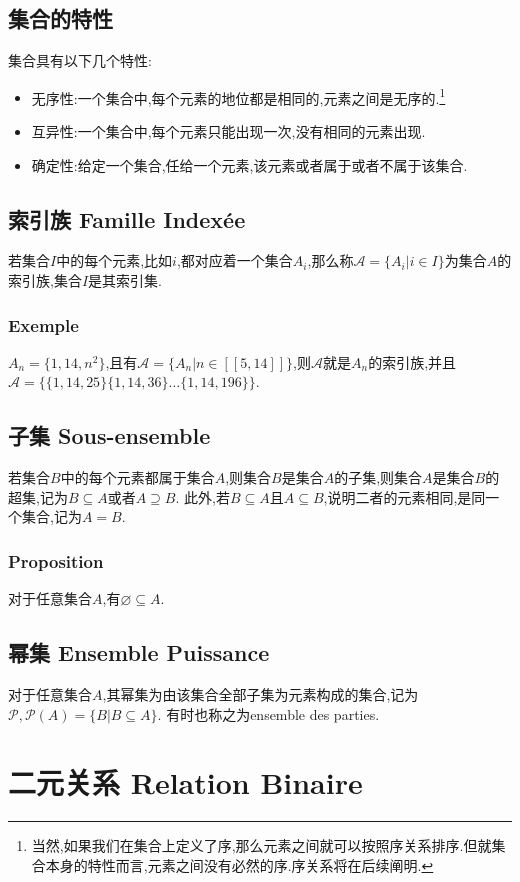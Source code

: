 \documentclass[12pt, a4paper, oneside]{ctexbook}
\begin{document}
  \subsection{集合的特性}
  集合具有以下几个特性:
  \begin{itemize}
    \item 无序性:一个集合中,每个元素的地位都是相同的,元素之间是无序的.\footnote{
      当然,如果我们在集合上定义了序,那么元素之间就可以按照序关系排序.但就集合本身的特性而言,元素之间没有必然的序.序关系将在后续阐明.
    }
    \item 互异性:一个集合中,每个元素只能出现一次,没有相同的元素出现.
    \item 确定性:给定一个集合,任给一个元素,该元素或者属于或者不属于该集合.\label{myref:quedingxing}
  \end{itemize}
  \subsection{索引族 Famille Indexée}
  若集合$I$中的每个元素,比如$i$,都对应着一个集合$A_i$,那么称$\mathscr{A}=\{A_i|i\in I\}$为集合$A$的索引族,集合$I$是其索引集.
  \subsubsection{Exemple}
  $A_n=\{1,14,n^2\}$,且有$\mathscr{A}=\{A_n|n\in [\![5,14]\!]\}$,则$\mathscr{A}$就是$A_n$的索引族,并且$\mathscr{A}=\{ \{1,14,25\}\{1,14,36\}\dots\{1,14,196\}\}$.
  \subsection{子集 Sous-ensemble}
  若集合$B$中的每个元素都属于集合$A$,则集合$B$是集合$A$的子集,则集合$A$是集合$B$的超集,记为$B\subseteq A$或者$A\supseteq B$.
  此外,若$B\subseteq A$且$A\subseteq B$,说明二者的元素相同,是同一个集合,记为$A=B$.
  \subsubsection{Proposition}
  对于任意集合$A$,有$\varnothing\subseteq A$.
  \subsection{幂集 Ensemble Puissance}
  对于任意集合$A$,其幂集为由该集合全部子集为元素构成的集合,记为$\mathcal{P},\mathcal{P}(A)=\{B| B\subseteq A\}$.
  有时也称之为ensemble des parties.

  \section{二元关系 Relation Binaire}
\end{document}
